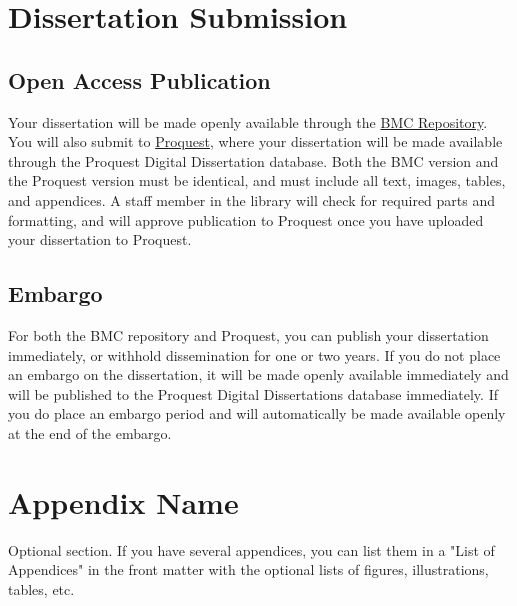 \documentclass[12pt]{report}
\begin{document}
\chapter{Dissertation Submission}
\section{Open Access Publication}
Your dissertation will be made openly available through the \href{https://repository.brynmawr.edu/}{BMC Repository}. You will also submit to \href{https://www.proquest.com/}{Proquest}, where your dissertation will be made available through the Proquest Digital Dissertation database. Both the BMC version and the Proquest version must be identical, and must include all text, images, tables, and appendices. A staff member in the library will check for required parts and formatting, and will approve publication to Proquest once you have uploaded your dissertation to Proquest.
\section{Embargo}
For both the BMC repository and Proquest, you can publish your dissertation immediately, or withhold dissemination for one or two years. If you do not place an embargo on the dissertation, it will be made openly available immediately and will be published to the Proquest Digital Dissertations database immediately. If you do place an embargo period and will automatically be made available openly at the end of the embargo. 

\appendix
{}
\chapter{Appendix Name}
Optional section. If you have several appendices, you can list them in a "List of Appendices" in the front matter with the optional lists of figures, illustrations, tables, etc.

\singlespacing
\printbibliography[heading=bibintoc, title={Bibliography}]
\end{document}
